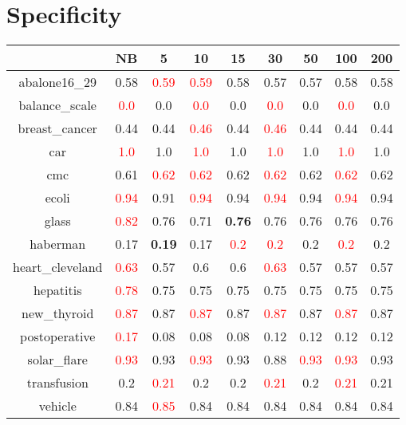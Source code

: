 \documentclass{article}%
\begin{document}
\section*{Specificity}%
\begin{tabular}{c|cccccccc}%
\hline%
&NB&5&10&15&30&50&100&200\\%
\hline%
abalone16\_29&0.58&\textcolor{red}{ 
0.59
}&\textcolor{red}{ 
0.59
}&0.58&0.57&0.57&0.58&0.58\\%
\hline%
balance\_scale&\textcolor{red}{ 
0.0
}&0.0&\textcolor{red}{ 
0.0
}&0.0&\textcolor{red}{ 
0.0
}&0.0&\textcolor{red}{ 
0.0
}&0.0\\%
\hline%
breast\_cancer&0.44&0.44&\textcolor{red}{ 
0.46
}&0.44&\textcolor{red}{ 
0.46
}&0.44&0.44&0.44\\%
\hline%
car&\textcolor{red}{ 
1.0
}&1.0&\textcolor{red}{ 
1.0
}&1.0&\textcolor{red}{ 
1.0
}&1.0&\textcolor{red}{ 
1.0
}&1.0\\%
\hline%
cmc&0.61&\textcolor{red}{ 
0.62
}&\textcolor{red}{ 
0.62
}&0.62&\textcolor{red}{ 
0.62
}&0.62&\textcolor{red}{ 
0.62
}&0.62\\%
\hline%
ecoli&\textcolor{red}{ 
0.94
}&0.91&\textcolor{red}{ 
0.94
}&0.94&\textcolor{red}{ 
0.94
}&0.94&\textcolor{red}{ 
0.94
}&0.94\\%
\hline%
glass&\textcolor{red}{ 
0.82
}&0.76&0.71&\textbf{0.76}&0.76&0.76&0.76&0.76\\%
\hline%
haberman&0.17&\textbf{0.19}&0.17&\textcolor{red}{ 
0.2
}&\textcolor{red}{ 
0.2
}&0.2&\textcolor{red}{ 
0.2
}&0.2\\%
\hline%
heart\_cleveland&\textcolor{red}{ 
0.63
}&0.57&0.6&0.6&\textcolor{red}{ 
0.63
}&0.57&0.57&0.57\\%
\hline%
hepatitis&\textcolor{red}{ 
0.78
}&0.75&0.75&0.75&0.75&0.75&0.75&0.75\\%
\hline%
new\_thyroid&\textcolor{red}{ 
0.87
}&0.87&\textcolor{red}{ 
0.87
}&0.87&\textcolor{red}{ 
0.87
}&0.87&\textcolor{red}{ 
0.87
}&0.87\\%
\hline%
postoperative&\textcolor{red}{ 
0.17
}&0.08&0.08&0.08&0.12&0.12&0.12&0.12\\%
\hline%
solar\_flare&\textcolor{red}{ 
0.93
}&0.93&\textcolor{red}{ 
0.93
}&0.93&0.88&\textcolor{red}{ 
0.93
}&\textcolor{red}{ 
0.93
}&0.93\\%
\hline%
transfusion&0.2&\textcolor{red}{ 
0.21
}&0.2&0.2&\textcolor{red}{ 
0.21
}&0.2&\textcolor{red}{ 
0.21
}&0.21\\%
\hline%
vehicle&0.84&\textcolor{red}{ 
0.85
}&0.84&0.84&0.84&0.84&0.84&0.84\\%

\end{tabular}
\end{document}
